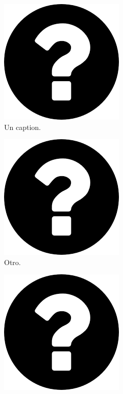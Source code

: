 \begin{figure}[!htpb]
     \centering
     \begin{subfigure}[b]{0.3\textwidth}
         \centering
         \includegraphics[width=.65\textwidth]{./Figures/questionMark}
         \caption{Un caption.}
         \label{fig:1de3}
     \end{subfigure}
     \hfill
     \begin{subfigure}[b]{0.3\textwidth}
         \centering
         \includegraphics[width=.65\textwidth]{./Figures/questionMark}
         \caption{Otro.}
         \label{fig:2de3}
     \end{subfigure}
     \hfill
     \begin{subfigure}[b]{0.3\textwidth}
         \centering
         \includegraphics[width=.65\textwidth]{./Figures/questionMark}

\end{subfigure}
\end{figure}
